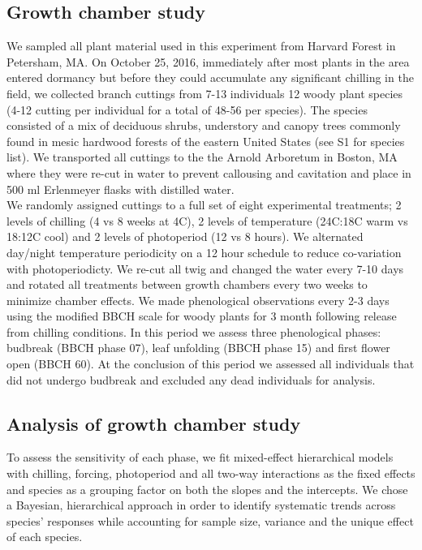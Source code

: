 \documentclass[11pt]{article}
\begin{document}
\subsection*{Growth chamber study}
\noindent We sampled all plant material used in this experiment from Harvard Forest in Petersham, MA. On October 25, 2016, immediately after most plants in the area entered dormancy but before they could accumulate any significant chilling in the field,  we collected branch cuttings from 7-13 individuals 12 woody plant species (4-12 cutting per individual for a total of 48-56 per species). The species consisted of a mix of deciduous shrubs, understory and canopy trees commonly found in mesic hardwood forests of the eastern United States (see S1 for species list). We transported all cuttings to the the Arnold Arboretum in Boston, MA where they were re-cut in water to prevent callousing and cavitation and place in 500 ml Erlenmeyer flasks with distilled water.\\ 

\noindent We randomly assigned cuttings to a full set of eight experimental treatments; 2 levels of chilling (4 vs 8 weeks at 4\degree C), 2 levels of temperature (24\degree C:18\degree C warm vs 18\degree:12\degree C cool) and 2 levels of photoperiod (12 vs 8 hours). We alternated day/night temperature periodicity on a 12 hour schedule to reduce co-variation with photoperiodicty. We re-cut all twig and changed the water every 7-10 days and rotated all treatments between growth chambers every two weeks to minimize chamber effects. We made phenological observations every 2-3 days using the modified BBCH scale for woody plants \citep{} for 3 month following release from chilling conditions. In this period we assess three phenological phases: budbreak (BBCH phase 07), leaf unfolding (BBCH phase 15) and first flower open (BBCH 60). At the conclusion of this period we assessed all individuals that did not undergo budbreak and excluded any dead individuals for analysis.

\subsection*{Analysis of growth chamber study}
\noindent To assess the sensitivity of each phase, we fit mixed-effect hierarchical models with chilling, forcing, photoperiod and all two-way interactions as the fixed effects and species as a grouping factor on both the slopes and the intercepts. We chose a Bayesian, hierarchical approach in order to identify systematic trends across species' responses while accounting for sample size, variance and the unique effect of each species.\\
\end{document}
